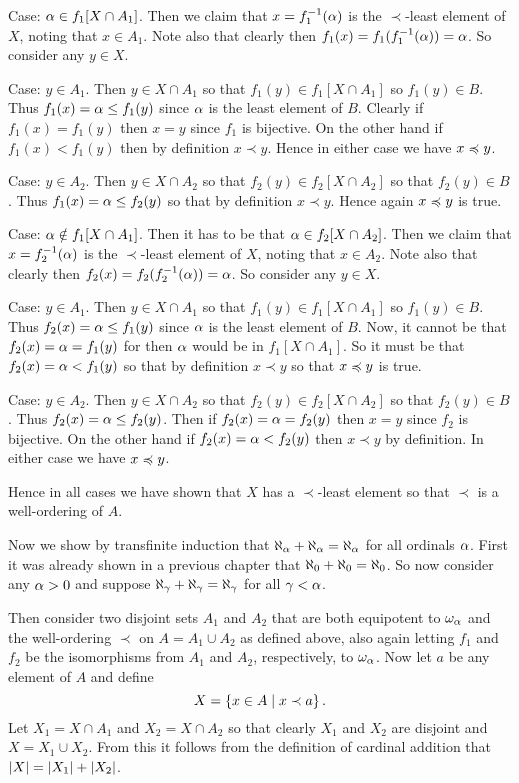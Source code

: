 {{Case: $\alpha \in f_1[X \cap A_1]$.
Then we claim that $x = f_1^{-1}(\alpha)$ is the $\prec$-least element of $X$, noting that $x \in A_1$.
Note also that clearly then $f_1(x) = f_1(f_1^{-1}(\alpha)) = \alpha$.
So consider any $y \in X$.
\begin{indpar}
  Case: $y \in A_1$.
  Then $y \in X \cap A_1$ so that $f_1(y) \in f_1[X \cap A_1]$ so $f_1(y) \in B$.
  Thus $f_1(x) = \alpha \leq f_1(y)$ since $\alpha$ is the least element of $B$.
  Clearly if $f_1(x) = f_1(y)$ then $x = y$ since $f_1$ is bijective.
  On the other hand if $f_1(x) < f_1(y)$ then by definition $x \prec y$.
  Hence in either case we have $x \preccurlyeq y$.

  Case: $y \in A_2$.
  Then $y \in X \cap A_2$ so that $f_2(y) \in f_2[X \cap A_2]$ so that $f_2(y) \in B$.
  Thus $f_1(x) = \alpha \leq f_2(y)$ so that by definition $x \prec y$.
  Hence again $x \preccurlyeq y$ is true.
\end{indpar}

Case: $\alpha \notin f_1[X \cap A_1]$.
Then it has to be that $\alpha \in f_2[X \cap A_2]$.
Then we claim that $x = f_2^{-1}(\alpha)$ is the $\prec$-least element of $X$, noting that $x \in A_2$.
Note also that clearly then $f_2(x) = f_2(f_2^{-1}(\alpha)) = \alpha$.
So consider any $y \in X$.
\begin{indpar}
  Case: $y \in A_1$.
  Then $y \in X \cap A_1$ so that $f_1(y) \in f_1[X \cap A_1]$ so $f_1(y) \in B$.
  Thus $f_2(x) = \alpha \leq f_1(y)$ since $\alpha$ is the least element of $B$.
  Now, it cannot be that $f_2(x) = \alpha = f_1(y)$ for then $\alpha$ would be in $f_1[X \cap A_1]$.
  So it must be that $f_2(x) = \alpha < f_1(y)$ so that by definition $x \prec y$ so that $x \preccurlyeq y$ is true.

  Case: $y \in A_2$.
  Then $y \in X \cap A_2$ so that $f_2(y) \in f_2[X \cap A_2]$ so that $f_2(y) \in B$.
  Thus $f_2(x) = \alpha \leq f_2(y)$.
  Then if $f_2(x) = \alpha = f_2(y)$ then $x = y$ since $f_2$ is bijective.
  On the other hand if $f_2(x) = \alpha < f_2(y)$ then $x \prec y$ by definition.
  In either case we have $x \preccurlyeq y$.
\end{indpar}
Hence in all cases we have shown that $X$ has a $\prec$-least element so that $\prec$ is a well-ordering of $A$.

Now we show by transfinite induction that $\aleph_\alpha + \aleph_\alpha = \aleph_\alpha$ for all ordinals $\alpha$.
First it was already shown in a previous chapter that $\aleph_0 + \aleph_0 = \aleph_0$.
So now consider any $\alpha > 0$ and suppose $\aleph_\gamma + \aleph_\gamma = \aleph_\gamma$ for all $\gamma < \alpha$.

Then consider two disjoint sets $A_1$ and $A_2$ that are both equipotent to $\omega_\alpha$ and the well-ordering $\prec$ on $A = A_1 \cup A_2$ as defined above, also again letting $f_1$ and $f_2$ be the isomorphisms from $A_1$ and $A_2$, respectively, to $\omega_\alpha$.
Now let $a$ be any element of $A$ and define
$$
  X = \left\{ x \in A \mid x \prec a \right\}.
$$
Let $X_1 = X \cap A_1$ and $X_2 = X \cap A_2$ so that clearly $X_1$ and $X_2$ are disjoint and $X = X_1 \cup X_2$.
From this it follows from the definition of cardinal addition that $\left| X \right| = \left| X_1 \right| + \left| X_2 \right|$.

}}
